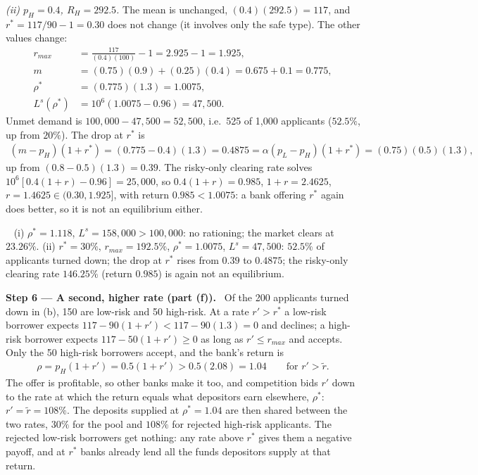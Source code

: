 \documentclass[11pt,a4paper]{article}
\newcommand{\step}[2]{\par\medskip\noindent\textbf{Step #1 --- #2.}~}
\newcommand{\answer}[1]{\par\smallskip\noindent\fbox{\textbf{Answer #1.}}~}
\begin{document}
\emph{(ii) $p_H=0.4$, $R_H=292.5$.} The mean is unchanged, $(0.4)(292.5)=117$, and $r^*=117/90-1=0.30$ does not change (it involves only the safe type). The other values change:
\begin{align}
  r_{max} &= \frac{117}{(0.4)(100)}-1 = 2.925-1 = 1.925, \nonumber\\
  m &= (0.75)(0.9)+(0.25)(0.4) = 0.675+0.1 = 0.775, \nonumber\\
  \rho^* &= (0.775)(1.3) = 1.0075, \nonumber\\
  L^s(\rho^*) &= 10^6(1.0075-0.96) = 47{,}500. \nonumber
\end{align}
Unmet demand is $100{,}000-47{,}500=52{,}500$, i.e.\ 525 of 1{,}000 applicants ($52.5\%$, up from $20\%$). The drop at $r^*$ is
\begin{align}
  (m-p_H)(1+r^*) = (0.775-0.4)(1.3) = 0.4875 = \alpha(p_L-p_H)(1+r^*) = (0.75)(0.5)(1.3), \nonumber
\end{align}
up from $(0.8-0.5)(1.3)=0.39$. The risky-only clearing rate solves $10^6[0.4(1+r)-0.96]=25{,}000$, so $0.4(1+r)=0.985$, $1+r=2.4625$, $r=1.4625\in(0.30,1.925]$, with return $0.985<1.0075$: a bank offering $r^*$ again does better, so it is not an equilibrium either.

\answer{(e)} (i) $\rho^*=1.118$, $L^s=158{,}000>100{,}000$: no rationing; the market clears at $23.26\%$. (ii) $r^*=30\%$, $r_{max}=192.5\%$, $\rho^*=1.0075$, $L^s=47{,}500$: $52.5\%$ of applicants turned down; the drop at $r^*$ rises from $0.39$ to $0.4875$; the risky-only clearing rate $146.25\%$ (return $0.985$) is again not an equilibrium.

\step{6}{A second, higher rate (part (f))} Of the 200 applicants turned down in (b), 150 are low-risk and 50 high-risk. At a rate $r'>r^*$ a low-risk borrower expects $117-90(1+r')<117-90(1.3)=0$ and declines; a high-risk borrower expects $117-50(1+r')\ge0$ as long as $r'\le r_{max}$ and accepts. Only the 50 high-risk borrowers accept, and the bank's return is
\begin{align}
  \rho = p_H(1+r') = 0.5(1+r') > 0.5(2.08) = 1.04 \qquad\text{for } r'>\tilde r. \nonumber
\end{align}
The offer is profitable, so other banks make it too, and competition bids $r'$ down to the rate at which the return equals what depositors earn elsewhere, $\rho^*$: $r'=\tilde r=108\%$. The deposits supplied at $\rho^*=1.04$ are then shared between the two rates, $30\%$ for the pool and $108\%$ for rejected high-risk applicants. The rejected low-risk borrowers get nothing: any rate above $r^*$ gives them a negative payoff, and at $r^*$ banks already lend all the funds depositors supply at that return.
\end{document}

